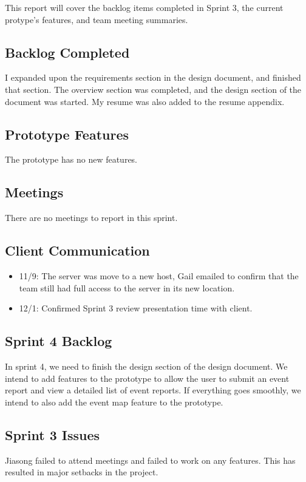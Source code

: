
This report will cover the backlog items completed in Sprint 3, the current protype's features, and team meeting summaries. 

 \subsection{Backlog Completed}
 I expanded upon the requirements section in the design document, and finished that section. The overview section was completed, and the design section of the document was started. My resume was also added to the resume appendix.
 
 \subsection{Prototype Features}
 The prototype has no new features.
 
 \subsection{Meetings}
There are no meetings to report in this sprint.

\subsection{Client Communication}
\begin{itemize}
\item11/9: The server was move to a new host, Gail emailed to confirm that the team still had full access to the server in its new location.
\item12/1: Confirmed Sprint 3 review presentation time with client.
\end{itemize}

\subsection{Sprint 4 Backlog}
In sprint 4, we need to finish the design section of the design document. We intend to add features to the prototype to allow the user to submit an event report and view a detailed list of event reports. If everything goes smoothly, we intend to also add the event map feature to the prototype.

\subsection{Sprint 3 Issues}
Jiasong failed to attend meetings and failed to work on any features. This has resulted in major setbacks in the project.
